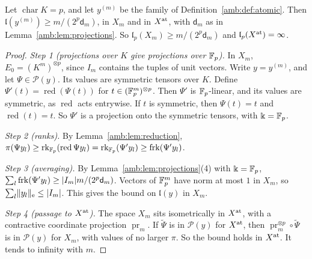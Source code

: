 \begin{lemma}\label{amb:lem:atomic}
Let $\operatorname{char}K=p$, and let $y^{(m)}$ be the family of Definition~\ref{amb:def:atomic}. Then $\mathfrak l(y^{(m)})\ge m/(2^p\mathsf d_m)$, in $X_m$ and in $X^{\rm at}$, with $\mathsf d_m$ as in Lemma~\ref{amb:lem:projections}. So $\mathfrak l_p(X_m)\ge m/(2^p\mathsf d_m)$ and $\mathfrak l_p(X^{\rm at})=\infty$.
\end{lemma}

\begin{proof}
\emph{Step 1 (projections over $K$ give projections over $\mathbb F_p$).} In $X_m$, $E_0=(K^m)^{\otimes p}$, since $I_m$ contains the tuples of unit vectors. Write $y=y^{(m)}$, and let $\Psi\in\mathcal P(y)$. Its values are symmetric tensors over $K$. Define $\Psi'(t)=\operatorname{red}(\Psi(t))$ for $t\in(\mathbb F_p^m)^{\otimes p}$. Then $\Psi'$ is $\mathbb F_p$\nobreakdash-linear, and its values are symmetric, as $\operatorname{red}$ acts entrywise. If $t$ is symmetric, then $\Psi(t)=t$ and $\operatorname{red}(t)=t$. So $\Psi'$ is a projection onto the symmetric tensors, with $\Bbbk=\mathbb F_p$.

\emph{Step 2 (ranks).} By Lemma~\ref{amb:lem:reduction}, $\pi(\Psi y_l)\ge\operatorname{rk}_{\mathbb F_p}(\operatorname{red}\Psi y_l)=\operatorname{rk}_{\mathbb F_p}(\Psi'y_l)\ge\operatorname{frk}(\Psi'y_l)$.

\emph{Step 3 (averaging).} By Lemma~\ref{amb:lem:projections}(4) with $\Bbbk=\mathbb F_p$, $\sum_l\operatorname{frk}(\Psi'y_l)\ge\lvert I_m\rvert m/(2^p\mathsf d_m)$. Vectors of $\mathbb F_p^m$ have norm at most $1$ in $X_m$, so $\sum_l\lVert y_l\rVert_{\rm e}\le\lvert I_m\rvert$. This gives the bound on $\mathfrak l(y)$ in $X_m$.

\emph{Step 4 (passage to $X^{\rm at}$).} The space $X_m$ sits isometrically in $X^{\rm at}$, with a contractive coordinate projection $\operatorname{pr}_m$. If $\tilde\Psi$ is in $\mathcal P(y)$ for $X^{\rm at}$, then $\operatorname{pr}_m^{\otimes p}\circ\tilde\Psi$ is in $\mathcal P(y)$ for $X_m$, with values of no larger $\pi$. So the bound holds in $X^{\rm at}$. It tends to infinity with $m$.
\end{proof}

